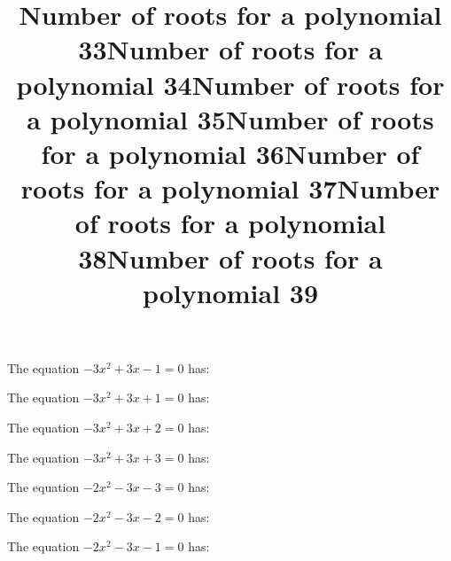\documentclass{article}
\begin{document}
\begin{category}
\begin{question}[multichoice]
\end{question}
\begin{question}[multichoice]
\title{Number of roots for a polynomial 33}
The equation $- 3 x^{2} + 3 x - 1=0$ has:


\end{question}
\begin{question}[multichoice]
\title{Number of roots for a polynomial 34}
The equation $- 3 x^{2} + 3 x + 1=0$ has:


\end{question}
\begin{question}[multichoice]
\title{Number of roots for a polynomial 35}
The equation $- 3 x^{2} + 3 x + 2=0$ has:


\end{question}
\begin{question}[multichoice]
\title{Number of roots for a polynomial 36}
The equation $- 3 x^{2} + 3 x + 3=0$ has:


\end{question}
\begin{question}[multichoice]
\title{Number of roots for a polynomial 37}
The equation $- 2 x^{2} - 3 x - 3=0$ has:


\end{question}
\begin{question}[multichoice]
\title{Number of roots for a polynomial 38}
The equation $- 2 x^{2} - 3 x - 2=0$ has:


\end{question}
\begin{question}[multichoice]
\title{Number of roots for a polynomial 39}
The equation $- 2 x^{2} - 3 x - 1=0$ has:


\end{question}
\end{category}
\end{document}
